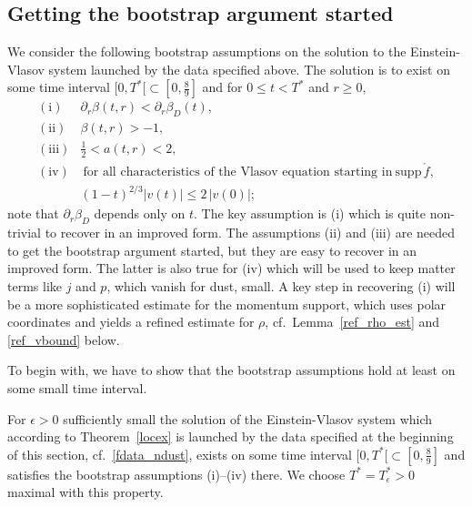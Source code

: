 \documentclass[11pt]{article}
\def\supp{\mathrm{supp}\,}
\begin{document}
\subsection{Getting the bootstrap argument started}
%
%
We consider the following bootstrap assumptions on the solution to the
Einstein-Vlasov system launched by the data specified above. The solution
is to exist on some time interval $[0,T^\ast[ \subset [0,\frac{8}{9}]$
and for $0\leq t < T^\ast$ and $r \geq 0$,
\[
\begin{array}{rc}
  \mathrm{(i)} &
  \displaystyle \partial_r \beta(t,r) < \partial_r \beta_D (t),\\
  \mathrm{(ii)} &
  \displaystyle \beta(t,r) >-1,\\
  \mathrm{(iii)} &
  \displaystyle \frac{1}{2} < a(t,r) < 2, \\
  \mathrm{(iv)} &
  \ \mbox{for all characteristics of the Vlasov equation
    starting in}\ \supp\mathring{f},\\
  & \displaystyle (1-t)^{2/3} |v(t)| \leq 2 \, |v(0)|;
\end{array}
\]
note that $\partial_r\beta_D$ depends only on $t$.
The key assumption is (i) which is quite non-trivial to recover in an
improved form. The assumptions (ii) and (iii) are needed to get the
bootstrap argument started, but they are easy to recover in an
improved form. The latter is also true for (iv) which will be used to
keep matter terms like $j$ and $p$, which vanish for dust, small.
A key step in recovering (i) will be a more sophisticated estimate
for the momentum support, which uses polar coordinates and yields
a refined estimate for $\rho$, cf.~Lemma~\ref{ref_rho_est} and
\eqref{ref_vbound} below.

To begin with, we have to show that the bootstrap assumptions hold at least
on some small time interval.

\begin{lemma}\label{ba_start}
  For $\epsilon>0$ sufficiently small the solution
  of the Einstein-Vlasov system which according to Theorem~\ref{locex}
  is launched by the data specified at the beginning of this section,
  cf.~\eqref{fdata_ndust}, exists on some time interval
  $[0,T^\ast[ \subset [0,\frac{8}{9}]$ and satisfies the bootstrap
  assumptions (i)--(iv) there. We choose $T^\ast=T^\ast_\epsilon >0$
  maximal with this property.    
\end{lemma}
\end{document}
